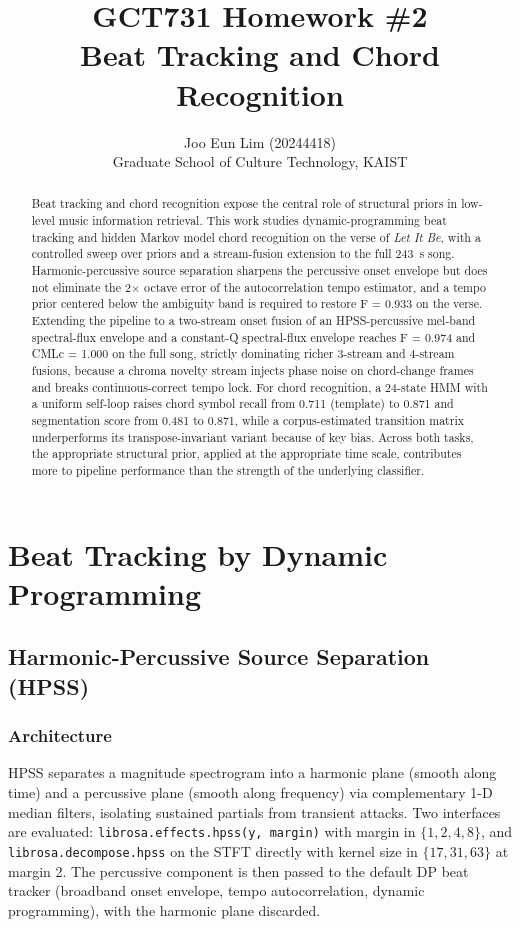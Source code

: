\documentclass{article}
\title{GCT731 Homework \#2\\Beat Tracking and Chord Recognition}
\author{%
  Joo Eun Lim (20244418) \\
  Graduate School of Culture Technology, KAIST
}
\begin{document}
\maketitle

\begin{abstract}
    Beat tracking and chord recognition expose the central role of structural priors in low-level music information retrieval. This work studies dynamic-programming beat tracking and hidden Markov model chord recognition on the verse of \textit{Let It Be}, with a controlled sweep over priors and a stream-fusion extension to the full 243~s song. Harmonic-percussive source separation \cite{fitzgerald2010hpss} sharpens the percussive onset envelope but does not eliminate the 2$\times$ octave error of the autocorrelation tempo estimator, and a tempo prior centered below the ambiguity band is required to restore F = 0.933 on the verse. Extending the pipeline to a two-stream onset fusion of an HPSS-percussive mel-band spectral-flux envelope and a constant-Q spectral-flux envelope \cite{bello2005onset,schorkhuber2010cqt} reaches F = 0.974 and CMLc = 1.000 on the full song, strictly dominating richer 3-stream and 4-stream fusions, because a chroma novelty stream injects phase noise on chord-change frames and breaks continuous-correct tempo lock. For chord recognition, a 24-state HMM with a uniform self-loop raises chord symbol recall from 0.711 (template) to 0.871 and segmentation score from 0.481 to 0.871, while a corpus-estimated transition matrix \cite{mueller2015fmp} underperforms its transpose-invariant variant because of key bias. Across both tasks, the appropriate structural prior, applied at the appropriate time scale, contributes more to pipeline performance than the strength of the underlying classifier.
\end{abstract}

\section{Beat Tracking by Dynamic Programming}

\subsection{Harmonic-Percussive Source Separation (HPSS)}

\subsubsection{Architecture}
HPSS \cite{fitzgerald2010hpss} separates a magnitude spectrogram into a harmonic plane (smooth along time) and a percussive plane (smooth along frequency) via complementary 1-D median filters, isolating sustained partials from transient attacks. Two interfaces are evaluated: \texttt{librosa.effects.hpss(y, margin)} with margin in $\{1, 2, 4, 8\}$, and \texttt{librosa.decompose.hpss} on the STFT directly with kernel size in $\{17, 31, 63\}$ at margin 2. The percussive component is then passed to the default DP beat tracker (broadband onset envelope, tempo autocorrelation, dynamic programming), with the harmonic plane discarded.
\end{document}
